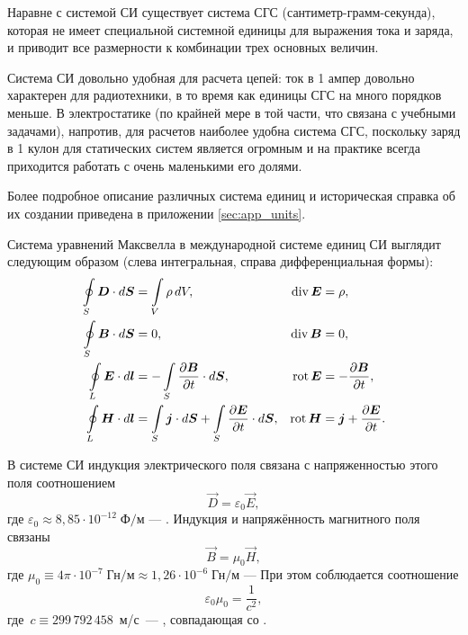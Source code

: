 Наравне с системой СИ существует система СГС (сантиметр-грамм-секунда), которая не имеет специальной системной единицы для выражения тока и заряда, и
приводит все размерности к комбинации трех основных величин.

Система СИ довольно удобная для расчета цепей: ток в 1 ампер довольно характерен для радиотехники,
в то время как единицы СГС на много порядков меньше. В электростатике (по крайней мере в той части, что связана с учебными задачами), напротив,
для расчетов наиболее удобна система СГС, поскольку заряд в 1 кулон для статических систем является огромным и на практике всегда приходится работать
с очень маленькими его долями.

Более подробное описание различных
система единиц и историческая справка об их создании приведена в приложении
\ref{sec:app_units}.

Система уравнений Максвелла в международной системе единиц СИ выглядит следующим
образом (слева интегральная, справа дифференциальная формы):
\begin{equation}
	\eqmark{maxwell-si}
	\begin{aligned}
		\oint\limits_S\vec{D}\cdot d\vec{S} &= \int\limits_V\rho\,dV,
								& \Div\vec{E} 				&= \rho,
								\\
		\oint\limits_S\vec{B}\cdot d\vec{S} &= 0,
								& \Div\vec{B}				&= 0,
								\\
		\oint\limits_L\vec{E}\cdot d\vec{l} &=
		-\int\limits_S\frac{\partial{\vec{B}}} {\partial t}\cdot d\vec{S}, 							& \Rot\vec{E} 	   			&=
-\frac{\partial\vec B}{\partial t}, \\
		\oint\limits_L\vec{H}\cdot d\vec{l} &=
		\int\limits_S\vec{j}\cdot d\vec{S} +
\int\limits_S\frac{\partial{\vec{E}}}{\partial t}\cdot d\vec{S}, 	& \Rot\vec{H}
&= \vec{j} + \frac{\partial\vec E}{\partial t}.
	\end{aligned}
\end{equation}

В системе СИ индукция электрического поля
связана с напряженностью этого поля соотношением
\begin{equation}
	\vec{D} = \varepsilon_0 \vec{E},
\end{equation}
где $\varepsilon_0 \approx 8,85\cdot10^{-12}\;\text{Ф/м}$ ---
. Индукция и напряжённость магнитного поля
связаны
\begin{equation}
	\vec{B} = \mu_0 \vec{H},
\end{equation}
где $\mu_0 \equiv 4\pi\cdot10^{-7}\;\text{Гн/м} \approx
1,26\cdot10^{-6}\;\text{Гн/м}$ --- 
При этом соблюдается соотношение
\begin{equation}
	\varepsilon_0 \mu_0 = \frac{1}{c^2},
\end{equation}
где~$c\equiv 299\,792\,458$~м/с~--- ,
совпадающая со .

